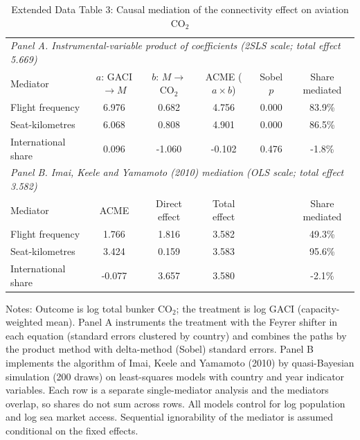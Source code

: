 \begin{table}[htbp]
\centering
\begin{threeparttable}
\caption{Extended Data Table 3: Causal mediation of the connectivity effect on aviation CO$_2$}
\label{tab:mediation}
\footnotesize
\begin{tabular}{lccccc}
\toprule
\multicolumn{6}{l}{\textit{Panel A. Instrumental-variable product of coefficients (2SLS scale; total effect 5.669)}} \\
Mediator & $a$: GACI$\rightarrow M$ & $b$: $M\rightarrow$CO$_2$ & ACME ($a\times b$) & Sobel $p$ & Share mediated \\
\midrule
  Flight frequency & 6.976 & 0.682 & 4.756 & 0.000 & 83.9\% \\
  Seat-kilometres & 6.068 & 0.808 & 4.901 & 0.000 & 86.5\% \\
  International share & 0.096 & -1.060 & -0.102 & 0.476 & -1.8\% \\
\midrule
\multicolumn{6}{l}{\textit{Panel B. Imai, Keele and Yamamoto (2010) mediation (OLS scale; total effect 3.582)}} \\
Mediator & ACME & Direct effect & Total effect & & Share mediated \\
\midrule
  Flight frequency & 1.766 & 1.816 & 3.582 & & 49.3\% \\
  Seat-kilometres & 3.424 & 0.159 & 3.583 & & 95.6\% \\
  International share & -0.077 & 3.657 & 3.580 & & -2.1\% \\
\bottomrule
\end{tabular}
\begin{tablenotes}[flushleft]
\footnotesize
\item Notes: Outcome is log total bunker CO$_2$; the treatment is log GACI (capacity-weighted mean). Panel A instruments the treatment with the Feyrer shifter in each equation (standard errors clustered by country) and combines the paths by the product method with delta-method (Sobel) standard errors. Panel B implements the algorithm of Imai, Keele and Yamamoto (2010) by quasi-Bayesian simulation (200 draws) on least-squares models with country and year indicator variables. Each row is a separate single-mediator analysis and the mediators overlap, so shares do not sum across rows. All models control for log population and log sea market access. Sequential ignorability of the mediator is assumed conditional on the fixed effects.
\end{tablenotes}
\end{threeparttable}
\end{table}
